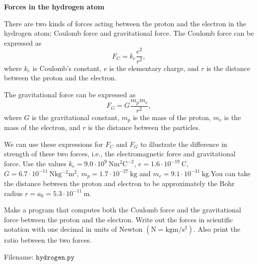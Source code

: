 \begin{Problem}{\textbf{Forces in the hydrogen atom}}\label{prob15}

\noindent There are two kinds of forces acting between the proton and the electron in the
hydrogen atom; Coulomb force and gravitational force. The Coulomb force can be
expressed as
\begin{equation*}
F_C = k_e \frac{e^2}{r^2},
\end{equation*}
where $k_e$ is Coulomb's constant, $e$ is the elementary charge, and $r$ is the
distance between the proton and the electron.

The gravitational force can be expressed as
\begin{equation*}
F_G = G\frac{m_pm_e}{r^2},
\end{equation*}
where $G$ is the gravitational constant, $m_p$ is the mass of the proton, $m_e$
is the mass of the electron, and $r$ is the distance between the particles.

We can use these expressions for $F_C$ and $F_G$ to illustrate the difference in
strength of these two forces, i.e., the electromagnetic force and gravitational force.
Use the values
$k_e = 9.0\cdot 10^9 \ \mathrm{Nm^2C^{-2}}$,
$e = 1.6\cdot 10^{-19} \ \mathrm{C}$, $G = 6.7\cdot 10^{-11} \ \mathrm{Nkg^{-2}m^2}$,
$m_p = 1.7\cdot 10^{-27} \ \mathrm{kg}$ and $m_e = 9.1 \cdot 10^{-31} \ \mathrm{kg}$.You can take the distance between the proton and electron to be approximately
the Bohr radius $r = a_0 = 5.3\cdot 10^{-11} \ \mathrm{m}$.

Make a program that computes both the Coulomb force and the gravitational force
between the proton and the electron. Write out the forces in scientific notation
with one decimal in units of Newton $(\mathrm{N = kg m/s^2})$. Also print the
ratio between the two forces.

Filename: $\texttt{hydrogen.py}$
\end{Problem}
